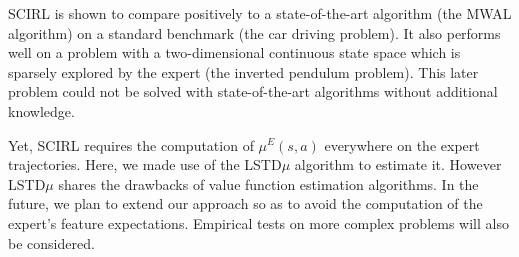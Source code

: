 \documentclass[tablecaption=bottom]{jmlr}
\begin{document}
SCIRL is shown to compare positively to a state-of-the-art algorithm
(the MWAL algorithm) on a standard benchmark (the car driving
problem). It also performs well on a problem with a two-dimensional
continuous state space which is sparsely explored by the expert (the
inverted pendulum problem). This later problem could not be solved
with state-of-the-art algorithms without additional knowledge.

Yet, SCIRL requires the computation of $\mu^E(s,a)$ everywhere on
the expert trajectories. Here, we made use of the LSTD$\mu$
algorithm to estimate it. However LSTD$\mu$ shares the drawbacks of
value function estimation algorithms. In the future, we plan to
extend our approach so as to avoid the computation of the expert's
feature expectations. Empirical tests on more complex problems will
also be considered.


%
\end{document}
